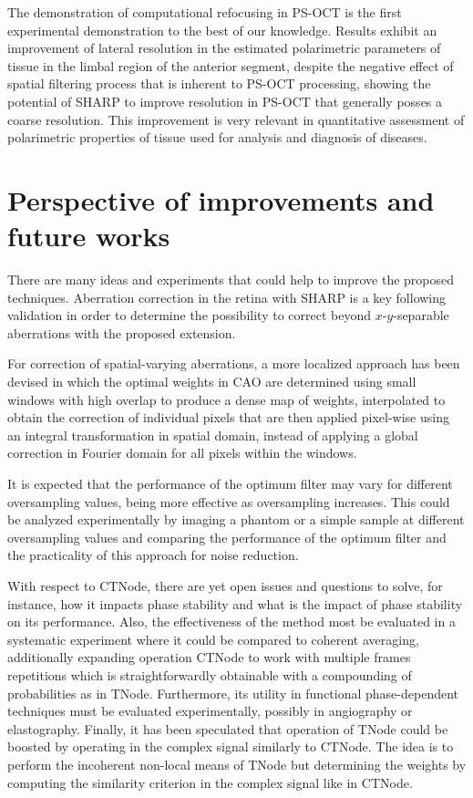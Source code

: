 The demonstration of computational refocusing in PS-OCT is the first experimental demonstration to the best of our knowledge. Results exhibit an improvement of lateral resolution in the estimated polarimetric parameters of tissue in the limbal region of the anterior segment, despite the negative effect of spatial filtering process that is inherent to PS-OCT processing, showing the potential of SHARP to improve resolution in PS-OCT that generally posses a coarse resolution. This improvement is very relevant in quantitative assessment of polarimetric properties of tissue used for analysis and diagnosis of diseases.

\section{Perspective of improvements and future works}

There are many ideas and experiments that could help to improve the proposed techniques. Aberration correction in the retina with SHARP is a key following validation in order to determine the possibility to correct beyond $x$-$y$-separable aberrations with the proposed extension.

For correction of spatial-varying aberrations, a more localized approach has been devised in which the optimal weights in CAO are determined using small windows with high overlap to produce a dense map of weights, interpolated to obtain the correction of individual pixels that are then applied pixel-wise using an integral transformation in spatial domain, instead of applying a global correction in Fourier domain for all pixels within the windows.

It is expected that the performance of the optimum filter may vary for different oversampling values, being more effective as oversampling increases. This could be analyzed experimentally by imaging a phantom or a simple sample at different oversampling values and comparing the performance of the optimum filter and the practicality of this approach for noise reduction.

With respect to CTNode, there are yet open issues and questions to solve, for instance, how it impacts phase stability and what is the impact of phase stability on its performance. Also, the effectiveness of the method most be evaluated in a systematic experiment where it could be compared to coherent averaging, additionally expanding operation CTNode to work with multiple frames repetitions which is straightforwardly obtainable with a compounding of probabilities as in TNode. Furthermore, its utility in functional phase-dependent techniques must be evaluated experimentally, possibly in angiography or elastography. Finally, it has been speculated that operation of TNode could be boosted by operating in the complex signal similarly to CTNode. The idea is to perform the incoherent non-local means of TNode but determining the weights by computing the similarity criterion in the complex signal like in CTNode.


